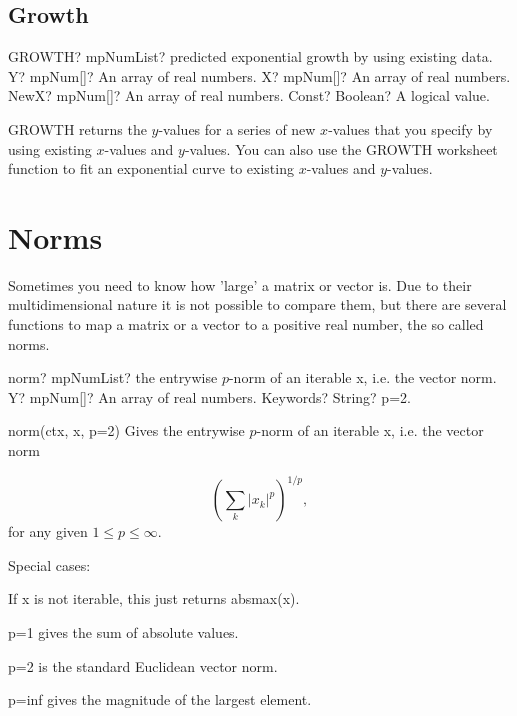 \subsection{Growth}

\begin{mpFunctionsExtract}
	\mpWorksheetFunctionFourNotImplemented
	{GROWTH? mpNumList? predicted exponential growth by using existing data.}
	{Y? mpNum[]? An array of real numbers.}
	{X? mpNum[]? An array of real numbers.}
	{NewX? mpNum[]? An array of real numbers.}
	{Const? Boolean? A logical value.}
\end{mpFunctionsExtract}

\vspace{0.3cm}
\textsf{GROWTH} returns the $y$-values for a series of new $x$-values that you specify by using existing $x$-values and $y$-values. You can also use the \textsf{GROWTH} worksheet function to fit an exponential curve to existing $x$-values and $y$-values.



\newpage
\section{Norms}
Sometimes you need to know how 'large' a matrix or vector is. Due to their multidimensional nature it is not possible to compare them, but there are several functions to map a matrix or a vector to a positive real number, the so called norms.

\vpara
\begin{mpFunctionsExtract}
	\mpFunctionTwo
	{norm? mpNumList? the entrywise $p$-norm of an iterable x, i.e. the vector norm.}
	{Y? mpNum[]? An array of real numbers.}
	{Keywords? String?  p=2.}
\end{mpFunctionsExtract}


norm(ctx, x, p=2)
Gives the entrywise $p$-norm of an iterable x, i.e. the vector norm 

\begin{equation}
	\left( \sum_k |x_k|^p \right)^{1/p},
\end{equation}
for any given $1 \leq p \leq \infty$.

Special cases:

If x is not iterable, this just returns absmax(x).

p=1 gives the sum of absolute values.

p=2 is the standard Euclidean vector norm.

p=inf gives the magnitude of the largest element.

